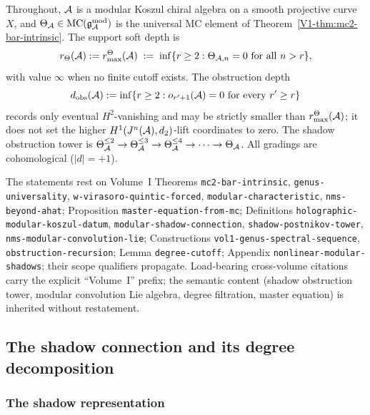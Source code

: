 Throughout, $\mathcal{A}$ is a modular Koszul chiral algebra on a
smooth projective curve~$X$, and $\Theta_{\mathcal{A}} \in \text{MC}(\mathfrak{g}_{\mathcal{A}}^{\mathrm{mod}})$ is the
universal MC element of
Theorem~\ref*{V1-thm:mc2-bar-intrinsic}. The support soft depth is
\[
r_\Theta(\mathcal{A}):=r^\Theta_{\max}(\mathcal{A})
\;:=\;
\inf\{r\ge2:\Theta_{\mathcal{A},n}=0\ \text{for all }n>r\},
\]
with value \(\infty\) when no finite cutoff exists. The obstruction
depth
\[
d_{\mathrm{obs}}(\mathcal{A}):=
\inf\{r\ge2:o_{r'+1}(\mathcal{A})=0\ \text{for every }r'\ge r\}
\]
records only eventual \(H^2\)-vanishing and may be strictly smaller
than \(r^\Theta_{\max}(\mathcal{A})\); it does not set the higher
\(H^1(J^n(\mathcal{A}),d_2)\)-lift coordinates to zero. The shadow
obstruction tower is
$\Theta_{\mathcal{A}}^{\leq 2} \to \Theta_{\mathcal{A}}^{\leq 3} \to
\Theta_{\mathcal{A}}^{\leq 4} \to \cdots \to \Theta_{\mathcal{A}}$.
All gradings are cohomological ($|d| = +1$).

\begin{remark}
The \ClaimStatusProvedHere{} statements rest on Volume~I
Theorems \texttt{mc2-bar-intrinsic},
\texttt{genus-universality}, \texttt{w-virasoro-quintic-forced},
\texttt{modular-characteristic}, \texttt{nms-beyond-ahat};
Proposition \texttt{master-equation-from-mc};
Definitions \texttt{holographic-modular-koszul-datum},
\texttt{modular-shadow-connection},
\texttt{shadow-postnikov-tower},
\texttt{nms-modular-convolution-lie};
Constructions \texttt{vol1-genus-spectral-sequence},
\texttt{obstruction-recursion};
Lemma \texttt{degree-cutoff};
Appendix \texttt{nonlinear-modular-shadows}; their scope qualifiers
propagate. Load-bearing cross-volume citations carry the explicit
``Volume~I'' prefix; the semantic content (shadow obstruction
tower, modular convolution Lie algebra, degree filtration, master
equation) is inherited without restatement.
\end{remark}

%
%

\subsection{The shadow connection and its degree decomposition}

\subsubsection{The shadow representation}

